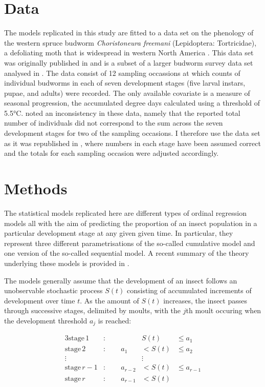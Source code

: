 \section{Data}
\label{sec:data}
The models replicated in this study are fitted to a data set on the phenology of the western spruce budworm \emph{Choristoneura freemani} (Lepidoptera: Tortricidae), a defoliating moth that is widespread in western North America \citep{brookes1987western}. This data set was originally published in \citep{dennis1986stochastic} and is a subset of a larger budworm survey data set analysed in \citep{kemp1986stochastic}. The data consist of 12 sampling occassions at which counts of individual budworms in each of seven development stages (five larval instars, pupae, and adults) were recorded. The only available covariate is a measure of seasonal progression, the accumulated degree days calculated using a threshold of 5.5°C. \citet{candy1991modeling} noted an inconsistency in these data, namely that the reported total number of individuals did not correspond to the sum across the seven development stages for two of the sampling occasions. I therefore use the data set as it was republished in \citep{candy1990biology}, where numbers in each stage have been assumed correct and the totals for each sampling occasion were adjusted accordingly.

\section{Methods}
The statistical models replicated here are different types of ordinal regression models \citep{agresti2010analysis} all with the aim of predicting the proportion of an insect population in a particular development stage at any given given time. In particular, they represent three different parametrisations of the so-called cumulative model and one version of the so-called sequential model. A recent summary of the theory underlying these models is provided in \citep{burkner2019ordinal}.

The models generally assume that the development of an insect follows an unobservable stochastic process $S(t)$ consisting of accumulated increments of development over time $t$. As the amount of $S(t)$ increases, the insect passes through successive stages, delimited by moults, with the $j$th moult occuring when the development threshold $a_j$ is reached:

\begin{alignat*}{3}
  \mathrm{stage}\,1&:\qquad {}&   S(t) & \leq a_1 \\
  \mathrm{stage}\,2&:\qquad  a_1&< S(t) & \leq a_2 \\
  \vdots & &\vdots \\
  \mathrm{stage}\,r-1&:\qquad  a_{r-2}&< S(t) & \leq a_{r-1} \\
  \mathrm{stage}\,r&:\qquad  a_{r-1}&< S(t) 
\end{alignat*}

